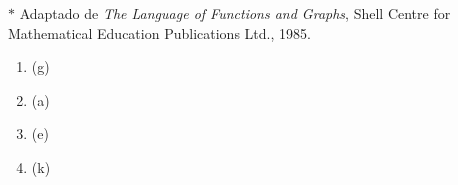 \documentclass[10 pt,usenames,dvipsnames, oneside]{article}
\begin{document}
\(*\) Adaptado de \emph{The Language of Functions and Graphs}, Shell Centre for Mathematical Education Publications Ltd., 1985.

\ifdefined\prof
\begin{solucao}
\begin{enumerate}
\item (g)

\item (a)

\item (e) 

\item (k)

\end{enumerate}
\end{solucao}
\fi
\end{document}
